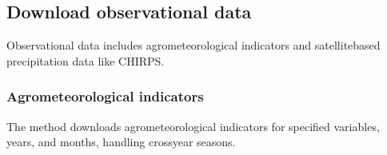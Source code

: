 \documentclass[letterpaper,10pt,english]{sphinxmanual}
\begin{document}
\sphinxAtStartPar
{}

\begin{sphinxVerbatim}[commandchars=\\\{\}]
 

  
    \PYG{p}{[}\PYG{p}{]}
    \PYG{p}{[}   \PYG{p}{]}
    \PYG{p}{[}  \PYG{p}{]}
\end{sphinxVerbatim}


\subsection{Download observational data}
\label{\detokenize{Download:download-observational-data}}
\sphinxAtStartPar
Observational data includes agro\sphinxhyphen{}meteorological indicators and satellite\sphinxhyphen{}based precipitation data like CHIRPS.


\subsubsection{Agro\sphinxhyphen{}meteorological indicators}
\label{\detokenize{Download:agro-meteorological-indicators}}
\sphinxAtStartPar
The  method downloads agro\sphinxhyphen{}meteorological indicators for specified variables, years, and months, handling cross\sphinxhyphen{}year seasons.
\end{document}
